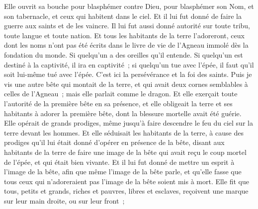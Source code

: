 \begin{multicols}{2}
Elle ouvrit sa bouche pour blasphémer contre Dieu, pour blasphémer son Nom, et son tabernacle, et ceux qui habitent dans le ciel.
Et il lui fut donné de faire la guerre aux saints et de les vaincre. Il lui fut aussi donné autorité sur toute tribu, toute langue et toute nation.
Et tous les habitants de la terre l'adoreront, ceux dont les noms n'ont pas été écrits dans le livre de vie de l'Agneau immolé dès la fondation du monde.
Si quelqu'un a des oreilles qu'il entende.
Si quelqu'un est destiné à la captivité, il ira en captivité~; si quelqu'un tue avec l'épée, il faut qu'il soit lui-même tué avec l'épée. C'est ici la persévérance et la foi des saints.
Puis je vis une autre bête qui montait de la terre, et qui avait deux cornes semblables à celles de l'Agneau~; mais elle parlait comme le dragon.
Et elle exerçait toute l'autorité de la première bête en sa présence, et elle obligeait la terre et ses habitants à adorer la première bête, dont la blessure mortelle avait été guérie.
Elle opérait de grands prodiges, même jusqu'à faire descendre le feu du ciel sur la terre devant les hommes.
Et elle séduisait les habitants de la terre, à cause des prodiges qu'il lui était donné d'opérer en présence de la bête, disant aux habitants de la terre de faire une image de la bête qui avait reçu le coup mortel de l'épée, et qui était bien vivante.
Et il lui fut donné de mettre un esprit à l'image de la bête, afin que même l'image de la bête parle, et qu'elle fasse que tous ceux qui n'adoreraient pas l'image de la bête soient mis à mort.
Elle fit que tous, petits et grands, riches et pauvres, libres et esclaves, reçoivent une marque sur leur main droite, ou sur leur front~;

\end{multicols}
